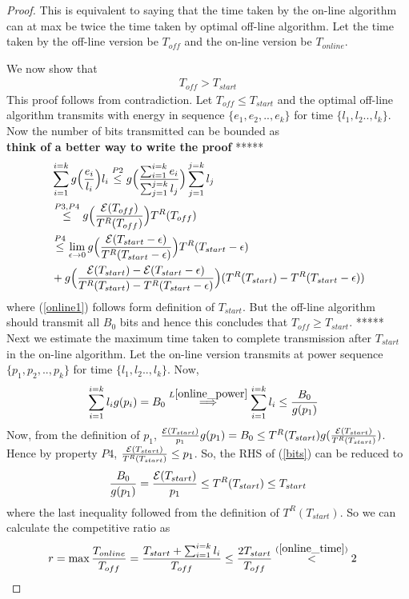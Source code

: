 \begin{proof}
This is equivalent to saying that the time taken by the on-line algorithm can at max be twice the time taken by optimal off-line algorithm. Let the time taken by the off-line version be $T_{off}$ and the on-line version be $T_{online}$. 

We now show that 
\begin{align}
T_{off} > T_{start}
\label{online_time}
\end{align}
This proof follows from contradiction. Let $T_{off}\le T_{start}$ and the optimal off-line algorithm transmits with energy in sequence $\{e_1,e_2,..,e_k\}$ for time $\{l_1,l_2..,l_k\} $. Now the number of bits transmitted can be bounded as
\\
\textbf{think of a better way to write the proof}
*****
\begin{align}
&\sum_{i=1}^{i=k} g\Big{(}\frac{e_i}{l_i}\Big{)}l_i\stackrel{P2}{\le} g\Big{(}\frac{\sum_{i=1}^{i=k}e_i}{\sum_{j=1}^{j=k}l_j}\Big{)} \sum_{j=1}^{j=k} l_j 
\\
&\stackrel{P3,P4}{\le} g\Big{(}\frac{\ETx(T_{off})}{T^R(T_{off})}\Big{)} T^R(T_{off})
\\
&\stackrel{P4}{\le}\lim_{\epsilon \rightarrow 0} g\Big{(}\frac{\ETx(T_{start}-\epsilon)}{T^R(T_{start}-\epsilon)}\Big{)} T^R(T_{start}-\epsilon)
\\
&+ g\Big{(}\frac{\ETx(T_{start})-\ETx(T_{start}-\epsilon)}{T^R(T_{start})-T^R(T_{start}-\epsilon)}\Big{)} (T^R(T_{start})-T^R(T_{start}-\epsilon)) \label{online1}
\end{align}
where (\ref{online1}) follows form definition of $T_{start}$. But the off-line algorithm should transmit all $B_0$ bits and hence this concludes that $T_{off}\ge T_{start}$.
*****
\\
Next we estimate the maximum time taken to complete transmission after $T_{start}$ in the on-line algorithm. Let the on-line version transmits at power sequence $\{p_1,p_2,..,p_k\}$ for time $\{l_1,l_2..,l_k\} $. Now,
\begin{align}
&\sum_{i=1}^{i=k}l_ig(p_i)=B_0\stackrel{L\ref{online_power}}{\implies}\sum_{i=1}^{i=k}l_i\le \frac{B_0}{g(p_1)}\label{bits}
\end{align}
Now, from the definition of $p_1$, $\frac{\mathcal{E}(T_{start})}{p_1}g(p_1)=B_0 \le T^R(T_{start}) g(\frac{\mathcal{E}(T_{start})}{T^R(T_{start})})$. Hence by property $P4$, $\frac{\mathcal{E}(T_{start})}{T^R(T_{start})}\le p_1$. So, the RHS of (\ref{bits}) can be reduced to 
\begin{align}
&\frac{B_0}{g(p_1)} = \frac{\mathcal{E}(T_{start})}{p_1} \le T^R(T_{start})\le T_{start}
\\
\end{align}
where the last inequality followed from the definition of $T^R(T_{start})$. So we can calculate the competitive ratio as
\begin{align*}
&r=\max\dfrac{T_{online}}{T_{off}} = \dfrac{T_{start}+\sum_{i=1}^{i=k}l_i}{T_{off}} \le \dfrac{2 T_{start}}{T_{off}} \stackrel{(\ref{online_time})}{<} 2
\end{align*}      
\end{proof}
